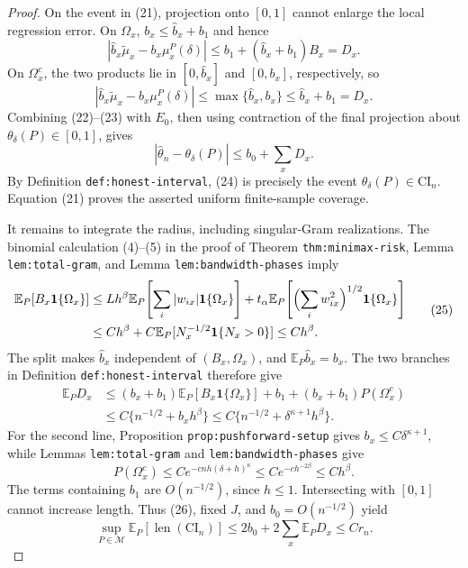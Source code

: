 \documentclass{article}
\begin{document}
\begin{proof}
On the event in (21), projection onto \([0,1]\) cannot enlarge the local regression error.  On \(\Omega_x\), \(b_x\leq\widehat b_x+b_1\) and hence
\[
 |\widehat b_x\widetilde\mu_x-b_x\mu_x^P(\delta)|
 \leq b_1+(\widehat b_x+b_1)B_x=D_x. \tag{22}
\]
On \(\Omega_x^c\), the two products lie in \([0,\widehat b_x]\) and \([0,b_x]\), respectively, so
\[
 |\widehat b_x\widetilde\mu_x-b_x\mu_x^P(\delta)|
 \leq\max\{\widehat b_x,b_x\}\leq\widehat b_x+b_1=D_x. \tag{23}
\]
Combining (22)--(23) with \(E_0\), then using contraction of the final projection about \(\theta_\delta(P)\in[0,1]\), gives
\[
 |\widehat\theta_n-\theta_\delta(P)|\leq b_0+\sum_xD_x. \tag{24}
\]
By Definition \texttt{def:honest-interval}, (24) is precisely the event \(\theta_\delta(P)\in\mathrm{CI}_n\).  Equation (21) proves the asserted uniform finite-sample coverage.

It remains to integrate the radius, including singular-Gram realizations.  The binomial calculation (4)--(5) in the proof of Theorem \texttt{thm:minimax-risk}, Lemma \texttt{lem:total-gram}, and Lemma \texttt{lem:bandwidth-phases} imply
\[
 \begin{aligned}
 \mathbb E_P[B_x\mathbf 1\{\Omega_x\}]
 &\leq Lh^\beta\mathbb E_P\!\left[\sum_i|w_{ix}|\mathbf 1\{\Omega_x\}\right]
 +t_\alpha\mathbb E_P\!\left[\Bigl(\sum_iw_{ix}^2\Bigr)^{1/2}\mathbf 1\{\Omega_x\}\right]\\
 &\leq Ch^\beta+C\mathbb E_P[N_x^{-1/2}\mathbf 1\{N_x>0\}]
 \leq Ch^\beta. 
 \end{aligned} \tag{25}
\]
The split makes \(\widehat b_x\) independent of \((B_x,\Omega_x)\), and \(\mathbb E_P\widehat b_x=b_x\).  The two branches in Definition \texttt{def:honest-interval} therefore give
\[
 \begin{aligned}
 \mathbb E_PD_x
 &\leq(b_x+b_1)\mathbb E_P[B_x\mathbf 1\{\Omega_x\}]+b_1
 +(b_x+b_1)P(\Omega_x^c)\\
 &\leq C\{n^{-1/2}+b_xh^\beta\}
 \leq C\{n^{-1/2}+\delta^{\kappa+1}h^\beta\}. 
 \end{aligned} \tag{26}
\]
For the second line, Proposition \texttt{prop:pushforward-setup} gives \(b_x\leq C\delta^{\kappa+1}\), while Lemmas \texttt{lem:total-gram} and \texttt{lem:bandwidth-phases} give
\[
 P(\Omega_x^c)\leq Ce^{-cnh(\delta+h)^\kappa}
 \leq Ce^{-ch^{-2\beta}}\leq Ch^\beta. \tag{27}
\]
The terms containing \(b_1\) are \(O(n^{-1/2})\), since \(h\leq1\).  Intersecting with \([0,1]\) cannot increase length.  Thus (26), fixed \(J\), and \(b_0=O(n^{-1/2})\) yield
\[
 \sup_{P\in\mathcal M}\mathbb E_P[\operatorname{len}(\mathrm{CI}_n)]
 \leq2b_0+2\sum_x\mathbb E_PD_x\leq Cr_n. \tag{28}
\]


\end{proof}
\end{document}
